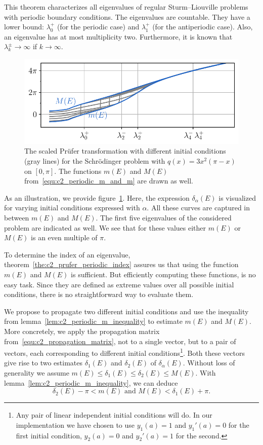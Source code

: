 This theorem characterizes all eigenvalues of regular Sturm--Liouville problems with periodic boundary conditions. The eigenvalues are countable. They have a lower bound: $\lambda^+_0$ (for the periodic case) and $\lambda^+_1$ (for the antiperiodic case). Also, an eigenvalue has at most multiplicity two. Furthermore, it is known that $\lambda^{\pm}_k \to \infty$ if $k \to \infty$.

\begin{figure}
    \begin{center}
        \includegraphics[width=\textwidth]{img/chapter2/prufer/periodic_minmax.pdf}
    \end{center}
    \caption{The scaled Prüfer transformation with different initial conditions (gray lines) for the Schrödinger problem with $q(x) = 3x^2(\pi - x)$ on $[0, \pi]$. The functions $m(E)$ and $M(E)$ from~\eqref{equ:c2_periodic_m_and_m} are drawn as well.}\label{fig:c2_periodic_m_and_m}
\end{figure}

As an illustration, we provide figure~\ref{fig:c2_periodic_m_and_m}. Here, the expression $\delta_\alpha(E)$ is visualized for varying initial conditions expressed with $\alpha$. All these curves are captured in between $m(E)$ and $M(E)$. The first five eigenvalues of the considered problem are indicated as well. We see that for these values either $m(E)$ or $M(E)$ is an even multiple of $\pi$.

To determine the index of an eigenvalue, theorem~\ref{the:c2_prufer_periodic_index} assures us that using the function $m(E)$ and $M(E)$ is sufficient. But efficiently computing these functions, is no easy task. Since they are defined as extreme values over all possible initial conditions, there is no straightforward way to evaluate them.

We propose to propagate two different initial conditions and use the inequality from lemma~\ref{lem:c2_periodic_m_inequality} to estimate $m(E)$ and $M(E)$. More concretely, we apply the propagation matrix from~\eqref{equ:c2_propagation_matrix}, not to a single vector, but to a pair of vectors, each corresponding to different initial conditions\footnote{Any pair of linear independent initial conditions will do. In our implementation we have chosen to use $y_1(a)=1$ and $y_1'(a) = 0$ for the first initial condition, $y_2(a)=0$ and $y_2'(a) = 1$ for the second.}. Both these vectors give rise to two estimates $\delta_1(E)$ and $\delta_2(E)$ of $\delta_\alpha(E)$. Without loss of generality we assume $m(E) \leq \delta_1(E) \leq \delta_2(E) \leq M(E)$. With lemma~\ref{lem:c2_periodic_m_inequality}, we can deduce
$$
    \delta_2(E) - \pi < m(E) \text{ and } M(E) < \delta_1(E) + \pi \text{.}
$$

